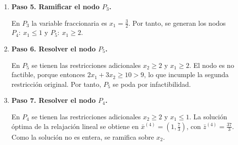\begin{enumerate}[label=\alph*)]
\begin{enumerate}
\begin{center}
\end{center}

\item \textbf{Paso 5. Ramificar el nodo $P_3$.}

En $P_3$ la variable fraccionaria es $x_1=\frac{3}{2}$. Por tanto, se generan los nodos $P_4:\ x_1\leq 1$ y $P_5:\ x_1\geq 2$.

\item \textbf{Paso 6. Resolver el nodo $P_5$.}

En $P_5$ se tienen las restricciones adicionales $x_2\geq 2$ y $x_1\geq 2$. El nodo es no factible, porque entonces $2x_1+3x_2\geq 10>9$, lo que incumple la segunda restricción original. Por tanto, $P_5$ se poda por infactibilidad.

\begin{center}
\end{center}

\item \textbf{Paso 7. Resolver el nodo $P_4$.}

En $P_4$ se tienen las restricciones adicionales $x_2\geq 2$ y $x_1\leq 1$. La solución óptima de la relajación lineal se obtiene en $\bar{x}^{(4)}=\left(1,\frac{7}{3}\right)$, con $\bar{z}^{(4)}=\frac{37}{3}$. Como la solución no es entera, se ramifica sobre $x_2$.

\begin{center}
\end{center}


\end{enumerate}
\end{enumerate}
